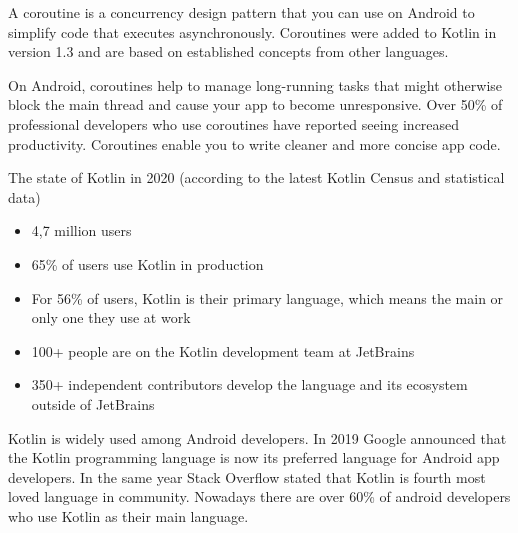 A coroutine is a concurrency design pattern that you can use on Android to simplify code that executes asynchronously. Coroutines were added to Kotlin in version 1.3 and are based on established concepts from other languages.

On Android, coroutines help to manage long-running tasks that might otherwise block the main thread and cause your app to become unresponsive. Over 50\% of professional developers who use coroutines have reported seeing increased productivity. Coroutines enable you to write cleaner and more concise app code.

The state of Kotlin in 2020 (according to the latest Kotlin Census and statistical data)
\begin{itemize}
    \item 4,7 million users
    \item 65\% of users use Kotlin in production
    \item For 56\% of users, Kotlin is their primary language, which means the main or only
    one they use at work
    \item 100+ people are on the Kotlin development team at JetBrains
    \item 350+ independent contributors develop the language and its ecosystem outside
    of JetBrains
\end{itemize}

Kotlin is widely used among Android developers. In 2019 Google announced that the Kotlin programming language is now its preferred language for Android app developers. In the same year Stack Overflow stated that Kotlin is fourth most loved language in community. Nowadays there are over 60\% of android developers who use Kotlin as their main language.